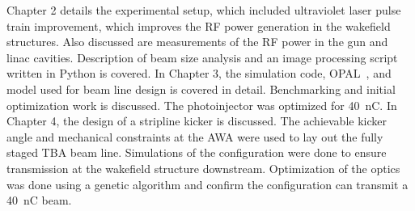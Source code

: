 Chapter 2 details the experimental setup, which included ultraviolet laser pulse train improvement, 
which improves the RF power generation in the wakefield structures.
Also discussed are measurements of the RF power in the gun and linac cavities.
Description of beam size analysis and an image processing script written in Python is covered.
In Chapter 3, the simulation code, OPAL~\cite{opal}, and model used for beam line design is covered in detail.
Benchmarking and initial optimization work is discussed. The photoinjector was optimized for \SI{40}{nC}. 
In Chapter 4, the design of a stripline kicker is discussed. 
The achievable kicker angle and mechanical constraints at the AWA 
were used to lay out the fully staged TBA beam line. 
Simulations of the configuration were done to ensure transmission at
the wakefield structure downstream. Optimization of the optics was done using 
a genetic algorithm and confirm the configuration can transmit a \SI{40}{nC} beam.



